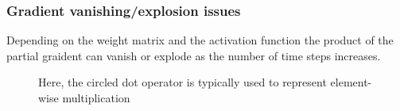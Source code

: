 \documentclass[11pt]{article}
\begin{document}
\subsubsection{Gradient vanishing/explosion issues}

Depending on the weight matrix and the activation function the product of the partial graident can vanish or explode as the number of time steps increases.

\begin{figure}[H]
    \centering
    \caption*{Here, the circled dot operator is typically used to represent element-wise multiplication}
\end{figure}
\end{document}
